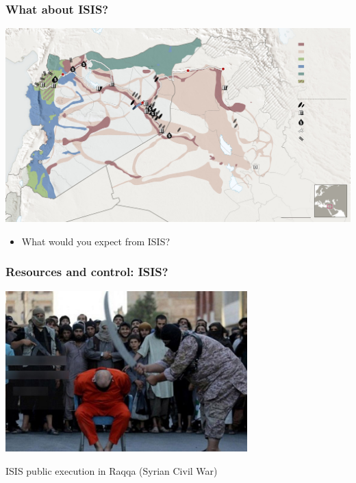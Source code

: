\documentclass[aspectratio=43]{beamer}
\begin{document}
\begin{frame}
\frametitle{What about ISIS?}
\centering

\includegraphics[width = \textwidth]{img/isis_syria_oil}

\begin{itemize}
  \item What would you expect from ISIS?
\end{itemize}


\end{frame}

\begin{frame}
\frametitle{Resources and control: ISIS?}
\centering

\includegraphics[width = 0.7\textwidth]{img/isis_raqqa}

\vspace{15pt}

ISIS public execution in Raqqa (Syrian Civil War)

\end{frame}
\end{document}
